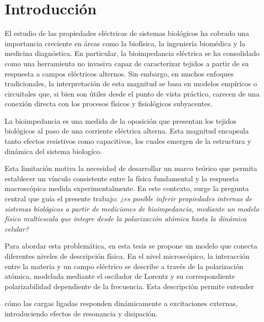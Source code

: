 \documentclass[12pt]{article}
\begin{document}
\tableofcontents

\newpage


\section{Introducci\'on}


El estudio de las propiedades el\'ectricas de sistemas biol\'ogicos ha cobrado una
importancia creciente en \'areas como la biof\'isica, la ingenier\'ia biom\'edica y la
medicina diagn\'ostica. En particular, la bioimpedancia el\'ectrica se ha consolidado
como una herramienta no invasiva capaz de caracterizar tejidos a partir de su
respuesta a campos el\'ectricos alternos. Sin embargo, en muchos enfoques
tradicionales, la interpretaci\'on de esta magnitud se basa en modelos emp\'iricos
o circuitales que, si bien son \'utiles desde el punto de vista pr\'actico, carecen
de una conexi\'on directa con los procesos f\'isicos y fisiol\'ogicos subyacentes.

La bioimpedancia es una medida de la oposici\'on que presentan los tejidos
biol\'ogicos al paso de una corriente el\'ectrica alterna. Esta magnitud encapsula
tanto efectos resistivos como capacitivos, los cuales emergen de la estructura
y din\'amica del sistema biolog\'ico.

Esta limitaci\'on motiva la necesidad de desarrollar un marco te\'orico que permita
establecer un v\'inculo consistente entre la f\'isica fundamental y la respuesta
macrosc\'opica medida experimentalmente. En este contexto, surge la pregunta
central que gu\'ia el presente trabajo: \emph{¿es posible inferir propiedades internas
de sistemas biol\'ogicos a partir de mediciones de bioimpedancia, mediante un
modelo f\'isico multiescala que integre desde la polarizaci\'on at\'omica hasta la
din\'amica celular?}

Para abordar esta problem\'atica, en esta tesis se propone un modelo que conecta
diferentes niveles de descripci\'on f\'isica. En el nivel microsc\'opico, la interacci\'on
entre la materia y un campo el\'ectrico se describe a trav\'es de la polarizaci\'on
at\'omica, modelada mediante el oscilador de Lorentz y su correspondiente
polarizabilidad dependiente de la frecuencia. Esta descripci\'on permite entender

c\'omo las cargas ligadas responden din\'amicamente a excitaciones externas,
introduciendo efectos de resonancia y disipaci\'on.
\end{document}

